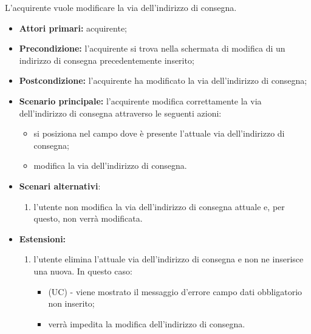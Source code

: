 L'acquirente vuole modificare la via dell'indirizzo di consegna.
\begin{itemize}
    \item \textbf{Attori primari:} acquirente;
    \item \textbf{Precondizione:} l'acquirente si trova nella schermata di modifica di un indirizzo di consegna precedentemente inserito;
    \item \textbf{Postcondizione:} l'acquirente ha modificato la via dell'indirizzo di consegna;
    \item \textbf{Scenario principale:} l'acquirente modifica correttamente la via dell'indirizzo di consegna attraverso le seguenti azioni:
    \begin{itemize}
        \item si posiziona nel campo dove è presente l'attuale via dell'indirizzo di consegna;
        \item modifica la via dell'indirizzo di consegna.
    \end{itemize}
    \item \textbf{Scenari alternativi}:
    \begin{enumerate}[label=\lett]
        \item l'utente non modifica la via dell'indirizzo di consegna attuale e, per questo, non verrà modificata.
    \end{enumerate}
    \item \textbf{Estensioni:}
    \begin{enumerate}[label=\lett]
        \item l'utente elimina l'attuale via dell'indirizzo di consegna e non ne inserisce una nuova. In questo caso:
        \begin{itemize}
            \item (UC) - viene mostrato il messaggio d'errore campo dati obbligatorio non inserito;
            \item verrà impedita la modifica dell'indirizzo di consegna.
        \end{itemize}
    \end{enumerate}
\end{itemize}

